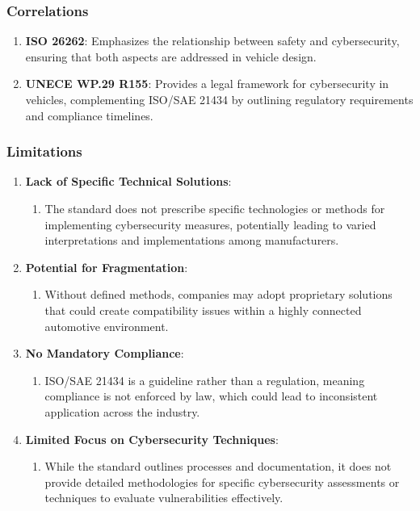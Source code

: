 \subsubsection{Correlations}\label{subsubsec:correlations}

\begin{enumerate}
    \item \textbf{ISO 26262}: Emphasizes the relationship between safety and cybersecurity, ensuring that both aspects are addressed in vehicle design.
    \item \textbf{UNECE WP.29 R155}: Provides a legal framework for cybersecurity in vehicles, complementing ISO/SAE 21434 by outlining regulatory requirements and compliance timelines.
\end{enumerate}

\subsubsection{Limitations}\label{subsubsec:limitations}

\begin{enumerate}
    \item \textbf{Lack of Specific Technical Solutions}:
    \begin{enumerate}
        \item The standard does not prescribe specific technologies or methods for implementing cybersecurity measures, potentially leading to varied interpretations and implementations among manufacturers.
    \end{enumerate}

    \item \textbf{Potential for Fragmentation}:
    \begin{enumerate}
        \item Without defined methods, companies may adopt proprietary solutions that could create compatibility issues within a highly connected automotive environment.
    \end{enumerate}

    \item \textbf{No Mandatory Compliance}:
    \begin{enumerate}
        \item ISO/SAE 21434 is a guideline rather than a regulation, meaning compliance is not enforced by law, which could lead to inconsistent application across the industry.
    \end{enumerate}

    \item \textbf{Limited Focus on Cybersecurity Techniques}:
    \begin{enumerate}
        \item While the standard outlines processes and documentation, it does not provide detailed methodologies for specific cybersecurity assessments or techniques to evaluate vulnerabilities effectively.
    \end{enumerate}
\end{enumerate}

